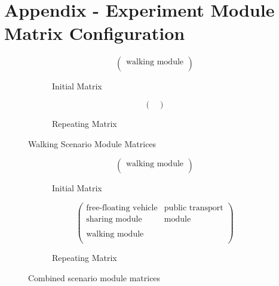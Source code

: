 \section{Appendix - Experiment Module Matrix Configuration}
\label{app:experiment_module_matrix_configuration}


\begin{figure}[ht]
    \centering
    \begin{subfigure}{0.45\linewidth}
        \centering
        \[
        \begin{pmatrix}
            \text{walking module} \\
        \end{pmatrix}
        \]
        \caption{Initial Matrix}
    \end{subfigure}
    \hfill
    \begin{subfigure}{0.45\linewidth}
        \centering
        \[
        \begin{pmatrix}
            \\
        \end{pmatrix}
        \]
        \caption{Repeating Matrix}
    \end{subfigure}
    \caption{Walking Scenario Module Matrices}
    \label{fig:walking_scenario_module_matrix}
\end{figure}


\begin{figure}[ht]
    \centering
    \begin{subfigure}{0.45\linewidth}
        \centering
        \[
        \begin{pmatrix}
            \text{walking module} \\
        \end{pmatrix}
        \]
        \caption{Initial Matrix}
    \end{subfigure}
    \hfill
    \begin{subfigure}{0.45\linewidth}
        \centering
        \[
        \begin{pmatrix}
            \text{free-floating vehicle} & \text{public transport} \\
            \text{sharing module} & \text{module} \\
            \\
            \text{walking module} & \\
        \end{pmatrix}
        \]
        \caption{Repeating Matrix}
    \end{subfigure}
    \caption{Combined scenario module matrices}
    \label{fig:combined_scenario_module_matrix}
\end{figure}

